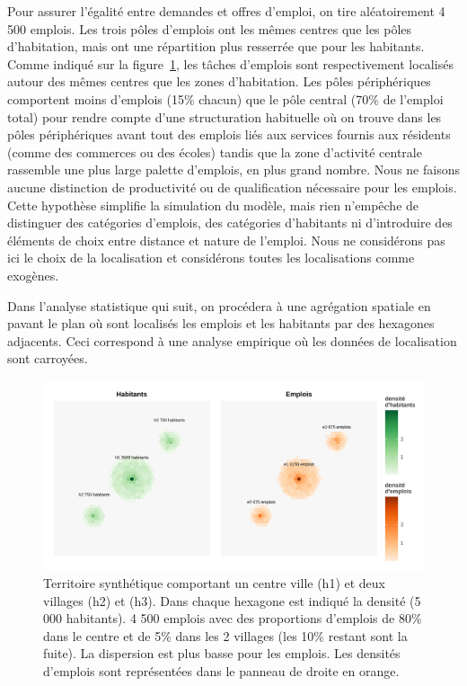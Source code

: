 \documentclass[
  10pt,
  a4paper,
  numbers=noendperiod,
  DIV=9]{scrartcl}
\begin{document}
Pour assurer l'égalité entre demandes et offres d'emploi, on tire
aléatoirement 4 500 emplois. Les trois pôles d'emplois ont les mêmes
centres que les pôles d'habitation, mais ont une répartition plus
resserrée que pour les habitants. Comme indiqué sur la
figure~\ref{fig-territoire}, les tâches d'emplois sont respectivement
localisés autour des mêmes centres que les zones d'habitation. Les pôles
périphériques comportent moins d'emplois (15\% chacun) que le pôle
central (70\% de l'emploi total) pour rendre compte d'une structuration
habituelle où on trouve dans les pôles périphériques avant tout des
emplois liés aux services fournis aux résidents (comme des commerces ou
des écoles) tandis que la zone d'activité centrale rassemble une plus
large palette d'emplois, en plus grand nombre. Nous ne faisons aucune
distinction de productivité ou de qualification nécessaire pour les
emplois. Cette hypothèse simplifie la simulation du modèle, mais rien
n'empêche de distinguer des catégories d'emplois, des catégories
d'habitants ni d'introduire des éléments de choix entre distance et
nature de l'emploi. Nous ne considérons pas ici le choix de la
localisation et considérons toutes les localisations comme exogènes.

Dans l'analyse statistique qui suit, on procédera à une agrégation
spatiale en pavant le plan où sont localisés les emplois et les
habitants par des hexagones adjacents. Ceci correspond à une analyse
empirique où les données de localisation sont carroyées.

\begin{figure}[htb]

{\centering \includegraphics[width=1\textwidth,height=\textheight]{output/gcarte_ss.png}

}

\caption[Territoire synthétique (centre + 2
villages)]{\label{fig-territoire}Territoire synthétique comportant un
centre ville (h1) et deux villages (h2) et (h3). Dans chaque hexagone
est indiqué la densité (5 000 habitants). 4 500 emplois avec des
proportions d'emplois de 80\% dans le centre et de 5\% dans les 2
villages (les 10\% restant sont la fuite). La dispersion est plus basse
pour les emplois. Les densités d'emplois sont représentées dans le
panneau de droite en orange.}

\end{figure}
\end{document}
